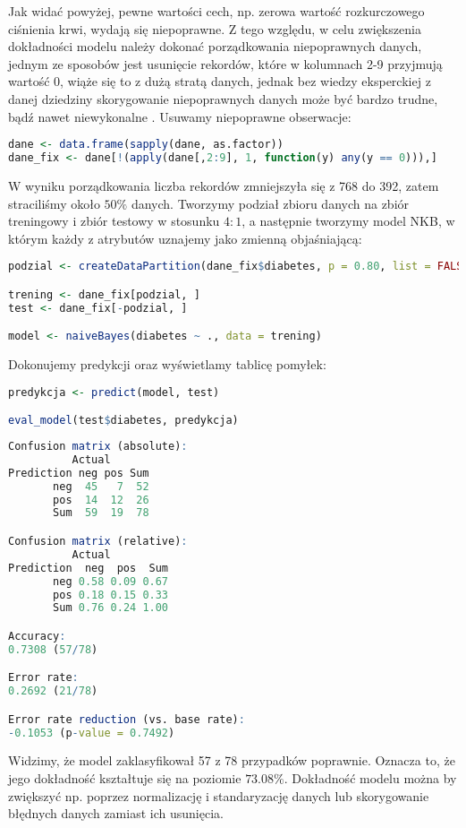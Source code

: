 \documentclass[a4paper]{article}
\begin{document}
Jak widać powyżej, pewne wartości cech, np. zerowa wartość rozkurczowego ciśnienia krwi, wydają się niepoprawne. Z tego względu, w celu zwiększenia dokładności modelu należy dokonać porządkowania niepoprawnych danych, jednym ze sposobów jest usunięcie rekordów, które w kolumnach 2-9 przyjmują wartość 0, wiąże się to z dużą stratą danych, jednak bez wiedzy eksperckiej z danej dziedziny skorygowanie niepoprawnych danych może być bardzo trudne, bądź nawet niewykonalne \cite{szeliga}. Usuwamy niepoprawne obserwacje: 
\begin{lstlisting}[language=R, frame = single]
dane <- data.frame(sapply(dane, as.factor))
dane_fix <- dane[!(apply(dane[,2:9], 1, function(y) any(y == 0))),]
\end{lstlisting}
W wyniku porządkowania liczba rekordów zmniejszyła się z 768 do 392, zatem straciliśmy około $50\%$ danych. Tworzymy podział zbioru danych na zbiór treningowy i zbiór testowy w stosunku $4:1$, a następnie tworzymy model NKB, w którym każdy z atrybutów uznajemy jako zmienną objaśniającą:
\begin{lstlisting}[language=R, frame=single]
podzial <- createDataPartition(dane_fix$diabetes, p = 0.80, list = FALSE)

trening <- dane_fix[podzial, ]
test <- dane_fix[-podzial, ]

model <- naiveBayes(diabetes ~ ., data = trening)
\end{lstlisting}
Dokonujemy predykcji oraz wyświetlamy tablicę pomyłek:
\begin{lstlisting}[language=R, frame=single]
predykcja <- predict(model, test)

eval_model(test$diabetes, predykcja)
\end{lstlisting}
\begin{lstlisting}[language=R, frame = single]
Confusion matrix (absolute):
          Actual
Prediction neg pos Sum
       neg  45   7  52
       pos  14  12  26
       Sum  59  19  78

Confusion matrix (relative):
          Actual
Prediction  neg  pos  Sum
       neg 0.58 0.09 0.67
       pos 0.18 0.15 0.33
       Sum 0.76 0.24 1.00

Accuracy:
0.7308 (57/78)

Error rate:
0.2692 (21/78)

Error rate reduction (vs. base rate):
-0.1053 (p-value = 0.7492)
\end{lstlisting}
Widzimy, że  model zaklasyfikował 57 z 78 przypadków poprawnie. Oznacza to, że  jego dokładność  kształtuje się na poziomie $73.08\%$. Dokładność modelu można by zwiększyć np. poprzez normalizację i standaryzację danych lub skorygowanie błędnych danych zamiast ich usunięcia.
\end{document}

